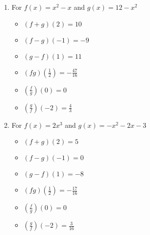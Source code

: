 \begin{enumerate}
\begin{multicols}{3}
\begin{itemize}
\end{itemize}
\end{multicols}

\item For  $f(x) = x^2 - x$ and  $g(x) = 12-x^2$

\begin{multicols}{3}
\begin{itemize}

\item  $(f+g)(2) = 10$
\item  $(f-g)(-1) = -9$
\item  $(g-f)(1) = 11$

\end{itemize}
\end{multicols}

\begin{multicols}{3}
\begin{itemize}

\item  $(fg)\left(\frac{1}{2}\right) = -\frac{47}{16}$
\item  $\left(\frac{f}{g}\right)(0) = 0$
\item  $\left(\frac{g}{f}\right)\left(-2\right) = \frac{4}{3}$

\end{itemize}
\end{multicols}

\item For $f(x) = 2x^3$ and  $g(x) = -x^2-2x-3$

\begin{multicols}{3}
\begin{itemize}

\item  $(f+g)(2) = 5$
\item  $(f-g)(-1) = 0$
\item  $(g-f)(1) = -8$

\end{itemize}
\end{multicols}

\begin{multicols}{3}
\begin{itemize}

\item  $(fg)\left(\frac{1}{2}\right) = -\frac{17}{16}$
\item  $\left(\frac{f}{g}\right)(0) = 0$
\item  $\left(\frac{g}{f}\right)\left(-2\right) = \frac{3}{16}$

\end{itemize}
\end{multicols}


\end{enumerate}
